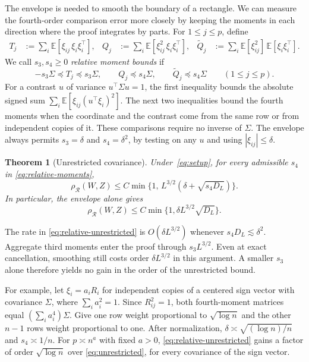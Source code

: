 \documentclass[11pt,letterpaper]{article}
\newtheorem{theorem}{Theorem}
\theoremstyle{remark}
\newcommand{\E}{\mathbb E}
\newcommand{\rh}{\rho_{\mathcal R}}
\begin{document}
The envelope is needed to smooth the boundary of a rectangle. We can measure the fourth-order comparison error more closely by keeping the moments in each direction where the proof integrates by parts. For $1\le j\le p$, define
\begin{align*}
 T_j&:=\sum_i\E[\xi_{ij}\,\xi_i\xi_i^\top],&
 Q_j&:=\sum_i\E[\xi_{ij}^2\,\xi_i\xi_i^\top],&
 \widetilde Q_j&:=\sum_i\E[\xi_{ij}^2]\,\E[\xi_i\xi_i^\top].
\end{align*}
We call $s_3,s_4\ge0$ \emph{relative moment bounds} if
\begin{equation}\label{eq:relative-moments}
 -s_3\Sigma\preceq T_j\preceq s_3\Sigma,\qquad
 Q_j\preceq s_4\Sigma,\qquad \widetilde Q_j\preceq s_4\Sigma
 \qquad (1\le j\le p).
\end{equation}
For a contrast $u$ of variance $u^\top\Sigma u=1$, the first inequality bounds the absolute signed sum $\sum_i\E[\xi_{ij}(u^\top\xi_i)^2]$. The next two inequalities bound the fourth moments when the coordinate and the contrast come from the same row or from independent copies of it. These comparisons require no inverse of $\Sigma$. The envelope always permits $s_3=\delta$ and $s_4=\delta^2$, by testing on any $u$ and using $|\xi_{ij}|\le\delta$.

\begin{theorem}[Unrestricted covariance]\label{thm:unrestricted}
Under~\eqref{eq:setup}, for every admissible $s_4$ in \eqref{eq:relative-moments},
\begin{equation}\label{eq:relative-unrestricted}
 \rh(W,Z)\le C\min\{1,\,L^{3/2}(\delta+\sqrt{s_4D_L})\}.
\end{equation}
In particular, the envelope alone gives
\begin{equation}
 \rh(W,Z)\le C\min\{1,\delta L^{3/2}\sqrt{D_L}\}.
 \label{eq:unrestricted}
\end{equation}
\end{theorem}
The rate in \eqref{eq:relative-unrestricted} is $O(\delta L^{3/2})$ whenever $s_4D_L\lesssim\delta^2$. Aggregate third moments enter the proof through $s_3L^{3/2}$. Even at exact cancellation, smoothing still costs order $\delta L^{3/2}$ in this argument. A smaller $s_3$ alone therefore yields no gain in the order of the unrestricted bound.

For example, let $\xi_i=a_i R_i$ for independent copies of a centered sign vector with covariance $\Sigma$, where $\sum_i a_i^2=1$. Since $R_{ij}^2=1$, both fourth-moment matrices equal $(\sum_i a_i^4)\Sigma$. Give one row weight proportional to $\sqrt{\log n}$ and the other $n-1$ rows weight proportional to one. After normalization, $\delta\asymp\sqrt{(\log n)/n}$ and $s_4\asymp1/n$. For $p\asymp n^a$ with fixed $a>0$, \eqref{eq:relative-unrestricted} gains a factor of order $\sqrt{\log n}$ over \eqref{eq:unrestricted}, for every covariance of the sign vector.
\end{document}
